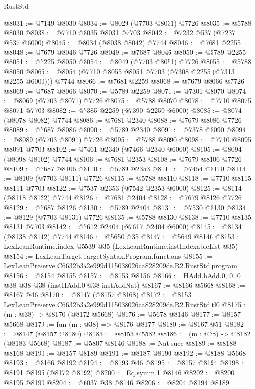 \begin{lexlean}{RustStd}
\begin{coremodule}
@8031 := @7149 @8030
@8034 := @8029 (@7703 @8031) @7726
@8035 := @5788 @8030
@8038 := @7710 @8035 @8031 @7703
@8042 := @7232 @537 (@7237 @537 @6000)
@8045 := @8034 (@8038 @8042) @7744
@8046 := @7681 @2255
@8048 := @7679 @8046 @7726
@8049 := @7687 @8046
@8050 := @5789 @2255
@8051 := @7225 @8050
@8054 := @8049 (@7703 @8051) @7726
@8055 := @5788 @8050
@8065 := @8054 (@7710 @8055 @8051 @7703 (@7308 @2255 (@7313 @2255 @6000))) @7744
@8066 := @7681 @2259
@8068 := @7679 @8066 @7726
@8069 := @7687 @8066
@8070 := @5789 @2259
@8071 := @7301 @8070
@8074 := @8069 (@7703 @8071) @7726
@8075 := @5788 @8070
@8078 := @7710 @8075 @8071 @7703
@8082 := @7385 @2259 (@7390 @2259 @6000)
@8085 := @8074 (@8078 @8082) @7744
@8086 := @7681 @2340
@8088 := @7679 @8086 @7726
@8089 := @7687 @8086
@8090 := @5789 @2340
@8091 := @7378 @8090
@8094 := @8089 (@7703 @8091) @7726
@8095 := @5788 @8090
@8098 := @7710 @8095 @8091 @7703
@8102 := @7461 @2340 (@7466 @2340 @6000)
@8105 := @8094 (@8098 @8102) @7744
@8106 := @7681 @2353
@8108 := @7679 @8106 @7726
@8109 := @7687 @8106
@8110 := @5789 @2353
@8111 := @7454 @8110
@8114 := @8109 (@7703 @8111) @7726
@8115 := @5788 @8110
@8118 := @7710 @8115 @8111 @7703
@8122 := @7537 @2353 (@7542 @2353 @6000)
@8125 := @8114 (@8118 @8122) @7744
@8126 := @7681 @2404
@8128 := @7679 @8126 @7726
@8129 := @7687 @8126
@8130 := @5789 @2404
@8131 := @7530 @8130
@8134 := @8129 (@7703 @8131) @7726
@8135 := @5788 @8130
@8138 := @7710 @8135 @8131 @7703
@8142 := @7612 @2404 (@7617 @2404 @6000)
@8145 := @8134 (@8138 @8142) @7744
@8146 := @5650 @35
@8147 := @5649 @8146
@8153 := LexLeanRuntime.index @5539 @35 (LexLeanRuntime.instIndexableList @35)
@8154 := LexLeanTarget.TargetSyntax.Program.functions
@8155 := LexLeanPreserve.C6632b3a2e999d115038026ca828209de.R2.RustStd.program
@8156 := @8154 @8155
@8157 := @8153 @8156
@8166 := HAdd.hAdd.{0, 0, 0} @38 @38 @38 (instHAdd.{0} @38 instAddNat)
@8167 := @8166 @5668
@8168 := @8167 @46
@8170 := @8147 (@8157 @8168)
@8172 := @8153 LexLeanPreserve.C6632b3a2e999d115038026ca828209de.R2.RustStd.tl0
@8175 := (m : @38) -> @8170 (@8172 @5668)
@8176 := @5678 @8146
@8177 := @8157 @5668
@8179 := fun (m : @38) => @8176 @8177
@8180 := @8167 @51
@8182 := @8147 (@8157 @8180)
@8183 := @8153 @5582
@8186 := (m : @38) -> @8182 (@8183 @5668)
@8187 := @5807 @8146
@8188 := Nat.succ
@8189 := @8188 @8168
@8190 := @8157 @8189
@8191 := @8187 @8190
@8192 := @8188 @5668
@8193 := @8166 @8192
@8194 := @8193 @46
@8195 := @8157 @8194
@8198 := @8191 @8195 (@8172 @8192)
@8200 := Eq.symm.{1} @8146
@8202 := @8200 @8195 @8190
@8204 := @6037 @38 @8146
@8206 := @8204 @8194 @8189

\end{coremodule}
\end{lexlean}
